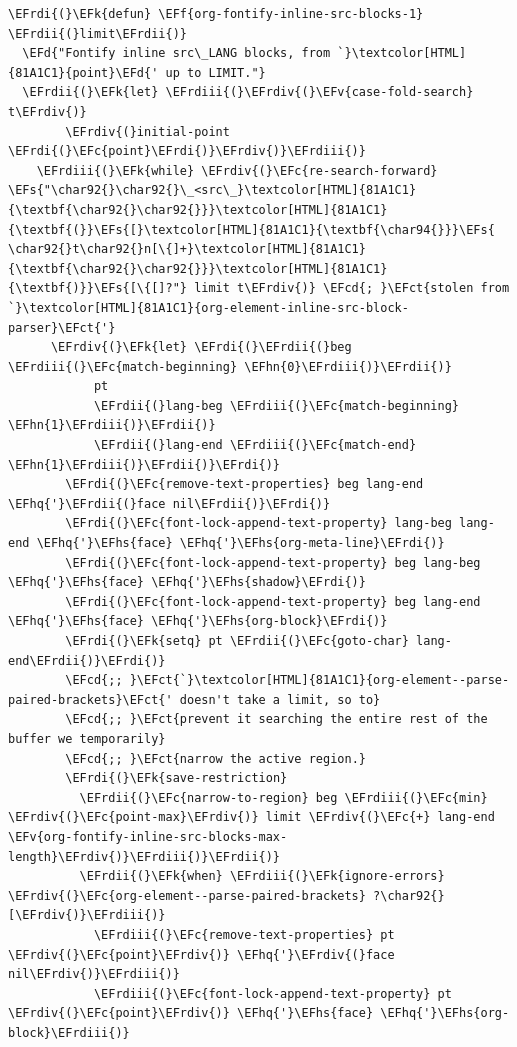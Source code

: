 \documentclass{scrartcl}
\newcommand{\EFk}[1]{\textcolor{EFk}{#1}} %
\newcommand{\EFd}[1]{\textcolor{EFd}{#1}} %
\newcommand{\EFs}[1]{\textcolor{EFs}{#1}} %
\newcommand{\EFct}[1]{\textcolor{EFct}{#1}} %
\newcommand{\EFc}[1]{\textcolor{EFc}{#1}} %
\newcommand{\EFv}[1]{\textcolor{EFv}{#1}} %
\newcommand{\EFf}[1]{\textcolor{EFf}{#1}} %
\newcommand{\EFcd}[1]{\textcolor{EFcd}{#1}} %
\newcommand{\EFhn}[1]{#1} %
\newcommand{\EFhq}[1]{#1} %
\newcommand{\EFhs}[1]{#1} %
\newcommand{\EFrdi}[1]{#1} %
\newcommand{\EFrdii}[1]{#1} %
\newcommand{\EFrdiii}[1]{#1} %
\newcommand{\EFrdiv}[1]{#1} %
\begin{document}
\begin{Code}
\begin{Verbatim}[]
\EFrdi{(}\EFk{defun} \EFf{org-fontify-inline-src-blocks-1} \EFrdii{(}limit\EFrdii{)}
  \EFd{"Fontify inline src\_LANG blocks, from `}\textcolor[HTML]{81A1C1}{point}\EFd{' up to LIMIT."}
  \EFrdii{(}\EFk{let} \EFrdiii{(}\EFrdiv{(}\EFv{case-fold-search} t\EFrdiv{)}
        \EFrdiv{(}initial-point \EFrdi{(}\EFc{point}\EFrdi{)}\EFrdiv{)}\EFrdiii{)}
    \EFrdiii{(}\EFk{while} \EFrdiv{(}\EFc{re-search-forward} \EFs{"\char92{}\char92{}\_<src\_}\textcolor[HTML]{81A1C1}{\textbf{\char92{}\char92{}}}\textcolor[HTML]{81A1C1}{\textbf{(}}\EFs{[}\textcolor[HTML]{81A1C1}{\textbf{\char94{}}}\EFs{ \char92{}t\char92{}n[\{]+}\textcolor[HTML]{81A1C1}{\textbf{\char92{}\char92{}}}\textcolor[HTML]{81A1C1}{\textbf{)}}\EFs{[\{[]?"} limit t\EFrdiv{)} \EFcd{; }\EFct{stolen from `}\textcolor[HTML]{81A1C1}{org-element-inline-src-block-parser}\EFct{'}
      \EFrdiv{(}\EFk{let} \EFrdi{(}\EFrdii{(}beg \EFrdiii{(}\EFc{match-beginning} \EFhn{0}\EFrdiii{)}\EFrdii{)}
            pt
            \EFrdii{(}lang-beg \EFrdiii{(}\EFc{match-beginning} \EFhn{1}\EFrdiii{)}\EFrdii{)}
            \EFrdii{(}lang-end \EFrdiii{(}\EFc{match-end} \EFhn{1}\EFrdiii{)}\EFrdii{)}\EFrdi{)}
        \EFrdi{(}\EFc{remove-text-properties} beg lang-end \EFhq{'}\EFrdii{(}face nil\EFrdii{)}\EFrdi{)}
        \EFrdi{(}\EFc{font-lock-append-text-property} lang-beg lang-end \EFhq{'}\EFhs{face} \EFhq{'}\EFhs{org-meta-line}\EFrdi{)}
        \EFrdi{(}\EFc{font-lock-append-text-property} beg lang-beg \EFhq{'}\EFhs{face} \EFhq{'}\EFhs{shadow}\EFrdi{)}
        \EFrdi{(}\EFc{font-lock-append-text-property} beg lang-end \EFhq{'}\EFhs{face} \EFhq{'}\EFhs{org-block}\EFrdi{)}
        \EFrdi{(}\EFk{setq} pt \EFrdii{(}\EFc{goto-char} lang-end\EFrdii{)}\EFrdi{)}
        \EFcd{;; }\EFct{`}\textcolor[HTML]{81A1C1}{org-element--parse-paired-brackets}\EFct{' doesn't take a limit, so to}
        \EFcd{;; }\EFct{prevent it searching the entire rest of the buffer we temporarily}
        \EFcd{;; }\EFct{narrow the active region.}
        \EFrdi{(}\EFk{save-restriction}
          \EFrdii{(}\EFc{narrow-to-region} beg \EFrdiii{(}\EFc{min} \EFrdiv{(}\EFc{point-max}\EFrdiv{)} limit \EFrdiv{(}\EFc{+} lang-end \EFv{org-fontify-inline-src-blocks-max-length}\EFrdiv{)}\EFrdiii{)}\EFrdii{)}
          \EFrdii{(}\EFk{when} \EFrdiii{(}\EFk{ignore-errors} \EFrdiv{(}\EFc{org-element--parse-paired-brackets} ?\char92{}[\EFrdiv{)}\EFrdiii{)}
            \EFrdiii{(}\EFc{remove-text-properties} pt \EFrdiv{(}\EFc{point}\EFrdiv{)} \EFhq{'}\EFrdiv{(}face nil\EFrdiv{)}\EFrdiii{)}
            \EFrdiii{(}\EFc{font-lock-append-text-property} pt \EFrdiv{(}\EFc{point}\EFrdiv{)} \EFhq{'}\EFhs{face} \EFhq{'}\EFhs{org-block}\EFrdiii{)}

\end{Verbatim}
\end{Code}
\end{document}

